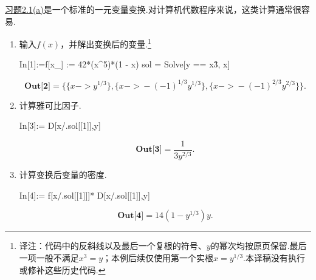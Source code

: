 \begin{example}[一元变换]\label{ex:12.6.2}
\hyperref[exercise:2.1]{习题2.1(a)}是一个标准的一元变量变换.对计算机代数程序来说，这类计算通常很容易.
\begin{enumerate}[label=(\arabic*)]
\item 输入$f(x)$，并解出变换后的变量.\footnote{译注：代码中的反斜线以及最后一个复根的符号、$y$的幂次均按原页保留.最后一项一般不满足$x^3=y$；本例后续仅使用第一个实根$x=y^{1/3}$.本译稿没有执行或修补这些历史代码.}
\begin{sourcecode}
In[1]:=f[x_] := 42*(x^5)*(1 - x)
sol = Solve[y == x\^3, x]
\end{sourcecode}
\begin{equation*}
\textbf{Out[2]}=\{\{x\mathbin{->}y^{1/3}\},\{x\mathbin{->}-(-1)^{1/3}y^{1/3}\},\{x\mathbin{->}-(-1)^{2/3}y^{2/3}\}\}.
\end{equation*}

\item 计算雅可比因子.
\begin{sourcecode}
In[3]:= D[x/.sol[[1]],y]
\end{sourcecode}
$$\textbf{Out[3]}=\frac{1}{3y^{2/3}}.$$
\item 计算变换后变量的密度.
\begin{sourcecode}
In[4]:= f[x/.sol[[1]]]* D[x/.sol[[1]],y]
\end{sourcecode}
$$\textbf{Out[4]}=14(1-y^{1/3})y.$$
\end{enumerate}
\end{example}

